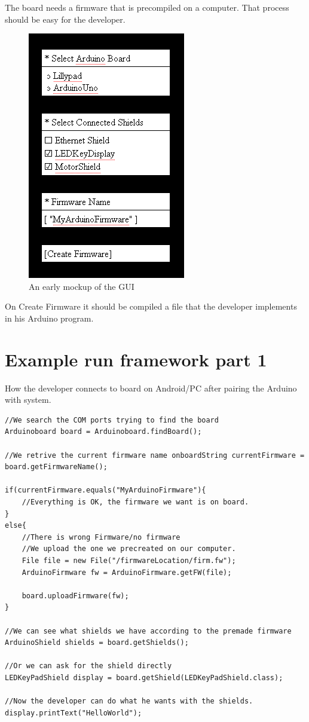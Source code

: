 The board needs a firmware that is precompiled on a computer.
That process should be easy for the developer.

\begin{figure}
  \centering
  \includegraphics{./img/architecture-mockupgui.png}
  \caption{An early mockup of the GUI}
  \label{fig:architecture-mockupgui}
\end{figure}

On Create Firmware it should be compiled a file that the developer implements in his Arduino program.

\section{Example run framework part 1}

How the developer connects to board on Android/PC after pairing the Arduino with system.

\javacode
\begin{lstlisting}
//We search the COM ports trying to find the board
Arduinoboard board = Arduinoboard.findBoard();

//We retrive the current firmware name onboardString currentFirmware = board.getFirmwareName();

if(currentFirmware.equals("MyArduinoFirmware"){
    //Everything is OK, the firmware we want is on board.
}
else{
    //There is wrong Firmware/no firmware
    //We upload the one we precreated on our computer.
    File file = new File("/firmwareLocation/firm.fw");
    ArduinoFirmware fw = ArduinoFirmware.getFW(file);

    board.uploadFirmware(fw);
}

//We can see what shields we have according to the premade firmware
ArduinoShield shields = board.getShields();

//Or we can ask for the shield directly
LEDKeyPadShield display = board.getShield(LEDKeyPadShield.class);

//Now the developer can do what he wants with the shields.
display.printText("HelloWorld");
\end{lstlisting}

